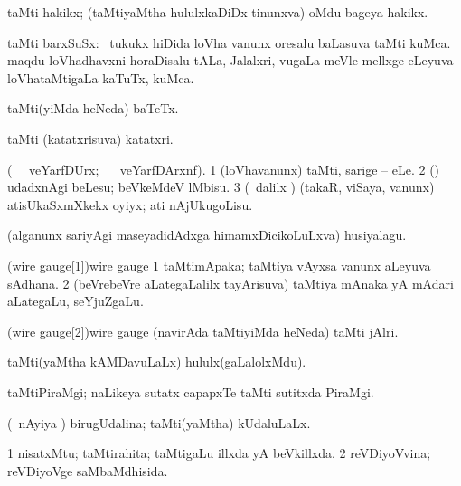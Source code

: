 {{{{{{\bentry
{}
  \gl{\nA}\bmng
taMti hakikx; (taMtiyaMtha hululxkaDiDx tinunxva) oMdu bageya hakikx. 
\emng
\eentry

\bentry
{}
 \gl{\nA}\bmng
taMti barxSuSx: 
\banum
{} \kanmu\ tukukx hiDida loVha \mo vanunx oresalu baLasuva taMti kuMca. 
 maqdu loVhadhavxni horaDisalu tALa, Jalalxri, \mo vugaLa meVle mellxge eLeyuva loVhataMtigaLa kaTuTx, kuMca. 
\eanum
\emng
\eentry

\bentry
{}
 \gl{\nA}\bmng
taMti(yiMda heNeda) baTeTx. 
\emng
\eentry

\bentry
{}
  \gl{\nA}\bmng
taMti (katatxrisuva) katatxri. 
\emng
\eentry

\bentry
{}
  \gl{\sakirx} (\BU\  \ucAcx\ veYarfDUrx; \BUkaq\  \ucAcx\ veYarfDArxnf).  \bmng
\bnum
\num{1} (loVhavanunx) taMti, sarige -- eLe. 
\num{2} (\rUpa) udadxnAgi beLesu; beVkeMdeV lMbisu. 
\num{3} (\kanmu\ \BUkaq dalilx \parx) (takaR, viSaya, \mo vanunx) atisUkaSxmXkekx oyiyx; ati nAjUkugoLisu. 
\enum
\emng
\eentry

\bentry
{}
  \gl{\nA}\bmng
(alganunx sariyAgi maseyadidAdxga himamxDicikoLuLxva) husiyalagu. 
\emng
\eentry

\bentry
\word(wire gauge[1]){wire gauge}
\gl{\nA}
\bmng
\bnum
\num{1} taMtimApaka; taMtiya vAyxsa \mo vanunx aLeyuva sAdhana. 
\num{2} (beVrebeVre aLategaLalilx tayArisuva) taMtiya mAnaka yA mAdari aLategaLu, seYjuZgaLu. 
\enum
\emng
\eentry

\bentry
\word(wire gauge[2]){wire gauge}
\gl{\nA}
\bmng
(navirAda taMtiyiMda heNeda) taMti jAlri. 
\emng
\eentry

\bentry
{}
 \gl{\nA}\bmng
taMti(yaMtha kAMDavuLaLx) hululx(gaLalolxMdu). 
\emng
\eentry

\bentry
{}
  \gl{\nA}\bmng
taMtiPiraMgi; naLikeya sutatx capapxTe taMti sutitxda PiraMgi. 
\emng
\eentry

\bentry
{}
  \gl{\gu}\bmng
(\kanmu\ nAyiya \vi) birugUdalina; taMti(yaMtha) kUdaluLaLx. 
\emng
\eentry

\bentry
{} 
\gl{\gu}
\expl{}
\bmng
\bnum
\num{1} nisatxMtu; taMtirahita; taMtigaLu illxda yA beVkillxda. 
\num{2} reVDiyoVvina; reVDiyoVge saMbaMdhisida. 
\enum
\emng
\eentry

}}}}}}
